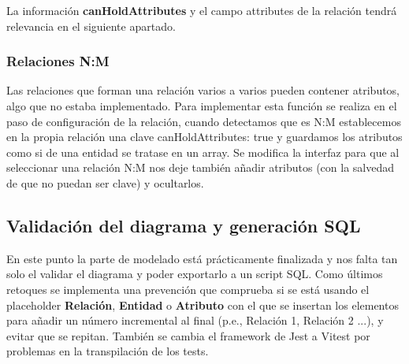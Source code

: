 La información \textbf{canHoldAttributes} y el campo attributes de la relación tendrá relevancia en el siguiente apartado.
\subsubsection{Relaciones N:M}
Las relaciones que forman una relación varios a varios pueden contener atributos, algo que no estaba implementado. Para implementar esta función se realiza en el paso de configuración de la relación, cuando detectamos que es N:M establecemos en la propia relación una clave canHoldAttributes: true y guardamos los atributos como si de una entidad se tratase en un array.
Se modifica la interfaz para que al seleccionar una relación N:M nos deje también añadir atributos (con la salvedad de que no puedan ser clave) y ocultarlos.

\subsection{Validación del diagrama y generación SQL}
En este punto la parte de modelado está prácticamente finalizada y nos falta tan solo el validar el diagrama y poder exportarlo a un script SQL.
Como últimos retoques se implementa una prevención que comprueba si se está usando el placeholder \textbf{Relación}, \textbf{Entidad} o \textbf{Atributo} con el que se insertan los elementos para añadir un número incremental al final (p.e., Relación 1, Relación 2 ...), y evitar que se repitan.
También se cambia el framework de Jest a Vitest por problemas en la transpilación de los tests.

